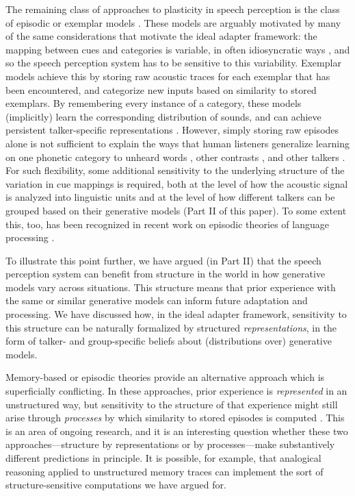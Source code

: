 The remaining class of approaches to plasticity in speech perception is the class of episodic or exemplar models \autocite[e.g.,][]{Goldinger1998,Johnson1997a,Johnson2006,Pierrehumbert2003}.  These models are arguably motivated by many of the same considerations that motivate the ideal adapter framework: the mapping between cues and categories is variable, in often idiosyncratic ways \autocite{Johnson2006}, and so the speech perception system has to be sensitive to this variability.  Exemplar models achieve this by storing raw acoustic traces for each exemplar that has been encountered, and categorize new inputs based on similarity to stored exemplars.  By remembering every instance of a category, these models (implicitly) learn the corresponding distribution of sounds, and can achieve persistent talker-specific representations \autocite{Goldinger1998,Johnson2006}.  However, simply storing raw episodes alone is not sufficient to explain the ways that human listeners generalize learning on one phonetic category to unheard words \autocite{Cutler2010,McQueen2006}, other contrasts \autocite{Kraljic2006}, and other talkers \autocite{Kraljic2006,Kraljic2007,Reinisch2014}.  For such flexibility, some additional sensitivity to the underlying structure of the variation in cue mappings is required, both at the level of how the acoustic signal is analyzed into linguistic units \autocite{Cutler2010} and at the level of how different talkers can be grouped based on their generative models (Part II of this paper).  To some extent this, too, has been recognized in recent work on episodic theories of language processing \autocite[e.g.,][]{Johnson2006,Johnson2013,Pierrehumbert2003,VandenBosch2013}.

\label{r2-structured-similiarty}

To illustrate this point further, we have argued (in Part II) that the speech perception system can benefit from structure in the world in how generative models vary across situations.  This structure means that prior experience with the same or similar generative models can inform future adaptation and processing.  We have discussed how, in the ideal adapter framework, sensitivity to this structure can be naturally formalized by structured \emph{representations}, in the form of talker- and group-specific beliefs about (distributions over) generative models.  

Memory-based or episodic theories provide an alternative approach which is superficially conflicting.  In these approaches, prior experience is \emph{represented} in an unstructured way, but sensitivity to the structure of that experience might still arise through \emph{processes} by which similarity to stored episodes is computed \autocite[e.g., analogical reasoning][]{VandenBosch2013}.  This is an area of ongoing research, and it is an interesting question whether these two approaches---structure by representations or by processes---make substantively different predictions in principle. It is possible, for example, that analogical reasoning applied to unstructured memory traces can implement the sort of structure-sensitive computations we have argued for.

